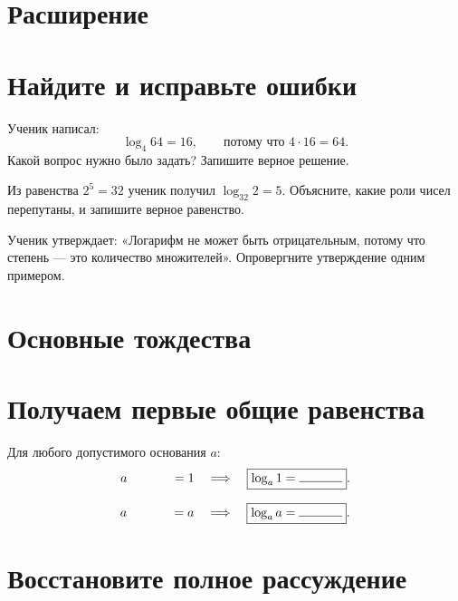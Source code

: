 \newpage
\section*{Расширение}

\section{Найдите и исправьте ошибки}

\begin{practicebox}[Ошибка 1]
  Ученик написал:
  \[
    \log_4 64=16,
    \qquad \text{потому что }4\cdot16=64.
  \]
  Какой вопрос нужно было задать? Запишите верное решение.
  \workarea{30mm}
\end{practicebox}

\begin{practicebox}[Ошибка 2]
  Из равенства \(2^5=32\) ученик получил \(\log_{32}2=5\).
  Объясните, какие роли чисел перепутаны, и запишите верное равенство.
  \workarea{28mm}
\end{practicebox}

\begin{practicebox}[Ошибка 3]
  Ученик утверждает: «Логарифм не может быть отрицательным, потому что
  степень --- это количество множителей». Опровергните утверждение одним
  примером.
  \workarea{24mm}
\end{practicebox}

\newpage
\section*{Основные тождества}

\section{Получаем первые общие равенства}

\begin{fillbox}
  Для любого допустимого основания \(a\):
  \[
    a^{\answerfraction[12mm]}=1
    \quad\Longrightarrow\quad
    \boxed{\log_a1=\answerblank[12mm]}.
  \]
\end{fillbox}

\begin{fillbox}
  \[
    a^{\answerfraction[12mm]}=a
    \quad\Longrightarrow\quad
    \boxed{\log_a a=\answerblank[12mm]}.
  \]
\end{fillbox}



\section{Восстановите полное рассуждение}

